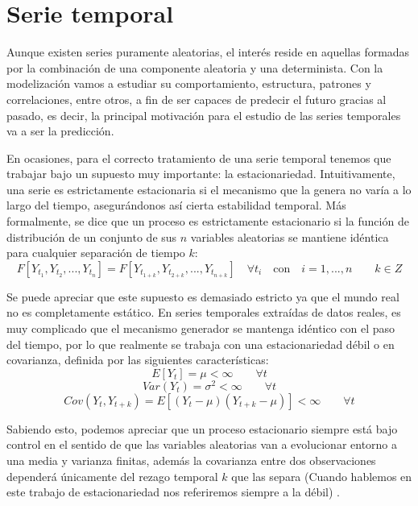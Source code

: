 \setcounter{section}{0}

\section{Serie temporal}
Aunque existen series puramente aleatorias, el interés reside en aquellas formadas por la combinación de una componente aleatoria y una determinista. Con la modelización vamos a estudiar su comportamiento, estructura, patrones y correlaciones, entre otros, a fin de ser capaces de predecir el futuro gracias al pasado, es decir, la principal motivación para el estudio de las series temporales va a ser la predicción.

En ocasiones, para el correcto tratamiento de una serie temporal tenemos que trabajar bajo un supuesto muy importante: la estacionariedad. Intuitivamente, una serie es estrictamente estacionaria si el mecanismo que la genera no varía a lo largo del tiempo, asegurándonos así cierta estabilidad temporal. Más formalmente, se dice que un proceso es estrictamente estacionario si la función de distribución de un conjunto de sus $n$ variables aleatorias se mantiene idéntica para cualquier separación de tiempo $k$:
\begin{equation}
    F[Y_{t_{1}}, Y_{t_{2}},...,Y_{t_{n}}]=F[Y_{t_{1+k}}, Y_{t_{2+k}},...,Y_{t_{n+k}}] \quad \forall{t_{i}} \quad\textrm{con}\quad i = 1,...,n \quad\quad
    k \in Z
\end{equation}

Se puede apreciar que este supuesto es demasiado estricto ya que el mundo real no es completamente estático. En series temporales extraídas de datos reales, es muy complicado que el mecanismo generador se mantenga idéntico con el paso del tiempo, por lo que realmente se trabaja con una estacionariedad débil o en covarianza, definida por las siguientes características:
\begin{equation}
    E[Y_{t}]=\mu<\infty \quad \quad \forall{t}
\end{equation}
\begin{equation}
    Var(Y_{t})=\sigma^2<\infty \quad \quad \forall{t}
\end{equation}
\begin{equation}
    Cov(Y_{t},Y_{t+k})=E[(Y_{t}-\mu)(Y_{t+k}-\mu)]<\infty \quad \quad \forall{t}
\end{equation}

Sabiendo esto, podemos apreciar que un proceso estacionario siempre está bajo control en el sentido de que las variables aleatorias van a evolucionar entorno a una media y varianza finitas, además la covarianza entre dos observaciones dependerá únicamente del rezago temporal $k$ que las separa (Cuando hablemos en este trabajo de estacionariedad nos referiremos siempre a la débil) \cite{shumway2010time}.

